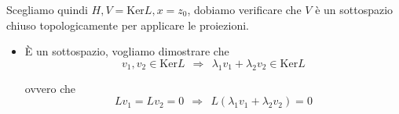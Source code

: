\documentclass[10pt,a4paper,twoside,openright]{book}
\begin{document}
\begin{dimostrazione}
\begin{itemize}
\begin{figure}[H]

              \end{figure}
              \FloatBarrier


              Scegliamo quindi $H,V=\mathrm{Ker} L,x=z_{0}$, dobiamo verificare che $V$ è un sottospazio chiuso topologicamente per applicare le proiezioni.
              \begin{itemize}
                  \item È un sottospazio, vogliamo dimostrare che
                        \begin{equation*}
                            v_{1},v_{2} \in \mathrm{Ker} L\ \ \Rightarrow \ \ \lambda _{1} v_{1} +\lambda _{2} v_{2} \in \mathrm{Ker} L
                        \end{equation*}

                        ovvero che
                        \begin{equation*}
                            Lv_{1} =Lv_{2} =0\ \ \Rightarrow \ \ L(\lambda _{1} v_{1} +\lambda _{2} v_{2}) =0
                        \end{equation*}


\end{itemize}
\end{itemize}
\end{dimostrazione}
\end{document}

